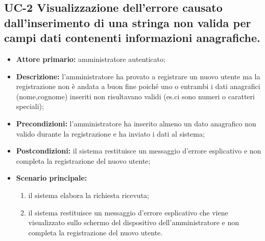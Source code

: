 \subsection{UC-2 Visualizzazione dell'errore causato dall'inserimento di una stringa non valida per campi dati contenenti informazioni anagrafiche.}
\begin{itemize}
	\item \textbf{Attore primario:} amministratore autenticato;

	\item \textbf{Descrizione:} l'amministratore ha provato a registrare un nuovo utente ma la registrazione non è andata a buon fine poiché uno o entrambi i dati anagrafici (nome,cognome) inseriti non risultavano validi (es.ci sono numeri o caratteri speciali);

	\item \textbf{Precondizioni:} l'amministratore ha inserito almeno un dato anagrafico non valido durante la registrazione e ha inviato i dati al sistema;

	\item \textbf{Postcondizioni:} il sistema restituisce un messaggio d'errore esplicativo e non completa la registrazione del nuovo utente;

	\item \textbf{Scenario principale:}
	      \begin{enumerate}
		      \item il sistema elabora la richiesta ricevuta;
		      \item il sistema restituisce un messaggio d'errore esplicativo che viene visualizzato sullo schermo del dispositivo dell'amministratore e non completa la registrazione del nuovo utente.
	      \end{enumerate}
\end{itemize}

